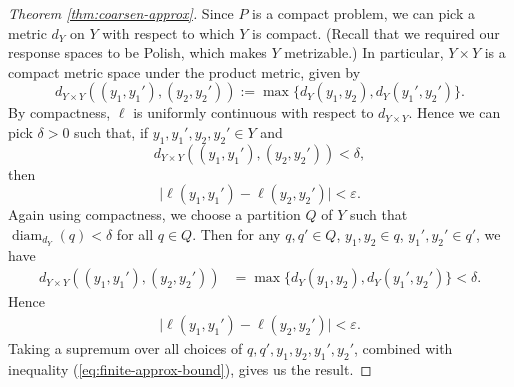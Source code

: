 \documentclass[twoside,11pt]{article}
\DeclareMathOperator{\diam}{diam}
\renewcommand{\epsilon}{\varepsilon}
\begin{document}
\begin{proof}[Theorem \ref{thm:coarsen-approx}]
    Since $P$ is a compact problem, we can pick a metric $d_Y$ on $Y$ with respect to which $Y$ is compact. (Recall that we required our response spaces to be Polish, which makes $Y$ metrizable.) In particular, $Y\times Y$ is a compact metric space under the product metric, given by
    \[d_{Y\times Y}((y_1,y_1'),(y_2,y_2')) := \max\{d_Y(y_1,y_2),d_Y(y_1',y_2')\}.\]
    By compactness, $\ell$ is uniformly continuous with respect to $d_{Y\times Y}$. Hence we can pick $\delta>0$ such that, if $y_1,y_1',y_2,y_2'\in Y$ and
    \[d_{Y\times Y}((y_1,y_1'),(y_2,y_2'))<\delta,\]
    then
    \[\big|\ell(y_1,y_1') - \ell(y_2,y_2')\big|<\epsilon.\]
    Again using compactness, we choose a partition $Q$ of $Y$ such that $\diam_{d_Y}(q)<\delta$ for all $q\in Q$. Then for any $q,q'\in Q$, $y_1,y_2\in q$, $y_1',y_2'\in q'$, we have
    \begin{align*}
    d_{Y\times Y}((y_1,y_1'),(y_2,y_2')) 
    & =\max\{d_Y(y_1,y_2),d_Y(y_1',y_2')\}
    < \delta.
    \end{align*}
    Hence
    \begin{align*}
    \big|\ell(y_1,y_1') - \ell(y_2,y_2')\big|<\epsilon.
    \end{align*}
    Taking a supremum over all choices of $q,q',y_1,y_2,y_1',y_2'$, combined with inequality (\ref{eq:finite-approx-bound}), gives us the result.
\end{proof}
\end{document}
